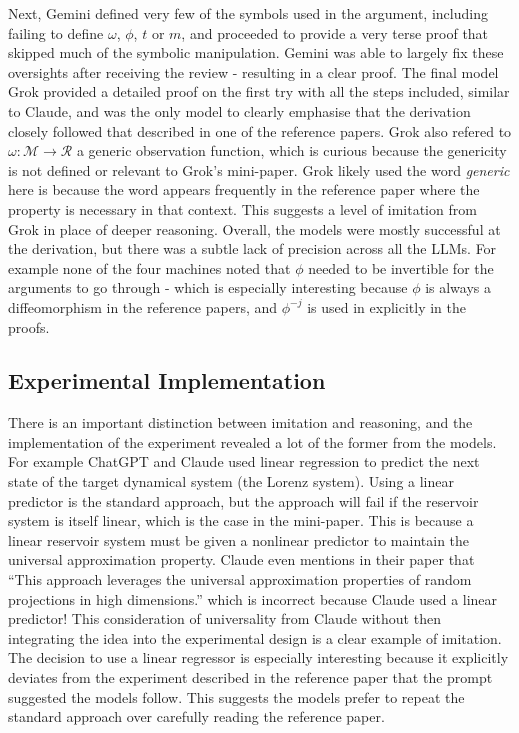 \documentclass[11pt]{article}
\begin{document}
Next, Gemini defined very few of the symbols used in the argument, including failing to define $\omega$, $\phi$, $t$ or $m$, and proceeded to provide a very terse proof that skipped much of the symbolic manipulation. Gemini was able to largely fix these oversights after receiving the review - resulting in a clear proof. The final model Grok provided a detailed proof on the first try with all the steps included, similar to Claude, and was the only model to clearly emphasise that the derivation closely followed that described in one of the reference papers. Grok also refered to $\omega: \mathcal{M} \to \mathcal{R}$ a generic observation function, which is curious because the genericity is not defined or relevant to Grok's mini-paper. Grok likely used the word \emph{generic} here is because the word appears frequently in the reference paper where the property is necessary in that context. This suggests a level of imitation from Grok in place of deeper reasoning. Overall, the models were mostly successful at the derivation, but there was a subtle lack of precision across all the LLMs. For example none of the four machines noted that $\phi$ needed to be invertible for the arguments to go through - which is especially interesting because $\phi$ is always a diffeomorphism in the reference papers, and $\phi^{-j}$ is used in explicitly in the proofs.

\subsection{Experimental Implementation}

There is an important distinction between imitation and reasoning, and the implementation of the experiment revealed a lot of the former from the models. For example ChatGPT and Claude used linear regression to predict the next state of the target dynamical system (the Lorenz system). Using a linear predictor is the standard approach, but the approach will fail if the reservoir system is itself linear, which is the case in the mini-paper. This is because a linear reservoir system must be given a nonlinear predictor to maintain the universal approximation property. Claude even mentions in their paper that ``This approach leverages the universal approximation properties of random projections in high dimensions.'' which is incorrect because Claude used a linear predictor! This consideration of universality from Claude without then integrating the idea into the experimental design is a clear example of imitation. The decision to use a linear regressor is especially interesting because it explicitly deviates from the experiment described in the reference paper that the prompt suggested the models follow. This suggests the models prefer to repeat the standard approach over carefully reading the reference paper. 
\end{document}
